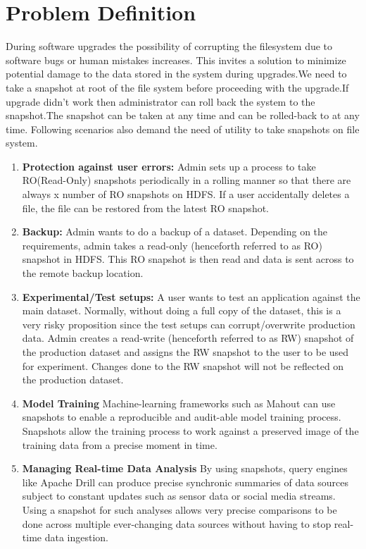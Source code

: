 \section{Problem Definition}
During software upgrades the possibility of corrupting the filesystem due to software bugs or human mistakes increases. This invites a solution to  minimize potential damage to the data stored in the system during upgrades.We need to take a snapshot at root of the file system before proceeding with the upgrade.If upgrade didn't work then administrator can roll back the system to the snapshot.The snapshot can be taken at any time and can be rolled-back to at any time. Following scenarios also demand the need of utility to take snapshots on file system.
\begin{enumerate}
\item \textbf{Protection against user errors:} Admin sets up a process to take RO(Read-Only) snapshots periodically in a
rolling manner so that there are always x number of RO snapshots on HDFS. If a user
accidentally deletes a file, the file can be restored from the latest RO snapshot.
\item \textbf{Backup:} Admin wants to do a backup of a dataset. Depending on the requirements, admin takes
a read-only (henceforth referred to as RO) snapshot in HDFS. This RO snapshot is then read and
data is sent across to the remote backup location.
\item \textbf{Experimental/Test setups:} A user wants to test an application against the main dataset. Normally, without doing a full copy of the dataset, this is a very risky proposition since the test setups can corrupt/overwrite production data. Admin creates a read-write (henceforth referred to as RW) snapshot of the production dataset and assigns the RW snapshot to the user to be used for experiment. Changes done to the RW snapshot will not be reflected on the production dataset.
\item \textbf{Model Training}
Machine-learning frameworks such as Mahout can use snapshots to enable a reproducible and audit-able model training process. Snapshots allow the training process to work against a preserved image of the training data from a precise moment in time. 
\item \textbf{Managing Real-time Data Analysis}
By using snapshots, query engines like Apache Drill can produce precise synchronic summaries of data sources subject to constant updates such as sensor data or social media streams. Using a snapshot for such analyses allows very precise comparisons to be done across multiple ever-changing data sources without having to stop real-time data ingestion.

\end{enumerate}
